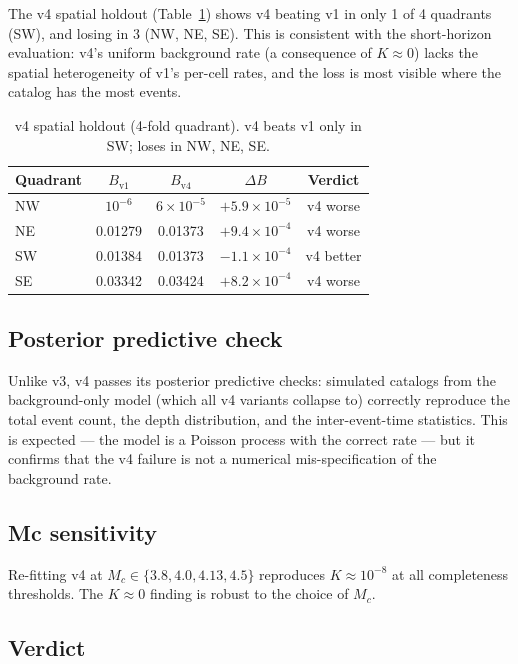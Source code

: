 \documentclass[10pt,a4paper,twocolumn]{article}
\begin{document}
The v4 spatial holdout (Table~\ref{tab:v4-holdout}) shows v4 beating v1 in only 1 of 4 quadrants (SW), and losing in 3 (NW, NE, SE). This is consistent with the short-horizon evaluation: v4's uniform background rate (a consequence of $K\approx0$) lacks the spatial heterogeneity of v1's per-cell rates, and the loss is most visible where the catalog has the most events.

\begin{table}[t]
\centering
\caption{v4 spatial holdout (4-fold quadrant). v4 beats v1 only in SW; loses in NW, NE, SE.}\label{tab:v4-holdout}
\small
\begin{tabular*}{\columnwidth}{@{\extracolsep{\fill}}lcccc}
\toprule
Quadrant & $B_{\text{v1}}$ & $B_{\text{v4}}$ & $\Delta B$ & Verdict \\
\midrule
NW & $10^{-6}$ & $6\times10^{-5}$ & $+5.9\times10^{-5}$ & v4 worse \\
NE & 0.01279 & 0.01373 & $+9.4\times10^{-4}$ & v4 worse \\
SW & 0.01384 & 0.01373 & $-1.1\times10^{-4}$ & v4 better \\
SE & 0.03342 & 0.03424 & $+8.2\times10^{-4}$ & v4 worse \\
\bottomrule
\end{tabular*}
\end{table}

\subsection{Posterior predictive check}

Unlike v3, v4 passes its posterior predictive checks: simulated catalogs from the background-only model (which all v4 variants collapse to) correctly reproduce the total event count, the depth distribution, and the inter-event-time statistics. This is expected --- the model is a Poisson process with the correct rate --- but it confirms that the v4 failure is not a numerical mis-specification of the background rate.

\subsection{Mc sensitivity}

Re-fitting v4 at $M_c\in\{3.8, 4.0, 4.13, 4.5\}$ reproduces $K\approx10^{-8}$ at all completeness thresholds. The $K\approx0$ finding is robust to the choice of $M_c$.

\subsection{Verdict}
\end{document}
